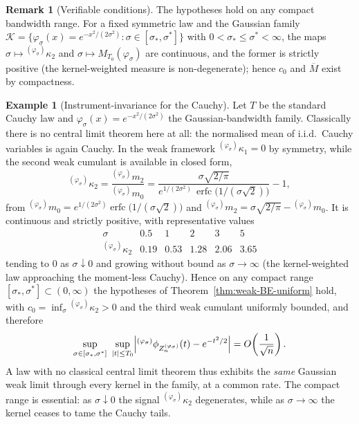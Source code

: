 \documentclass[12pt]{article}
\theoremstyle{definition}
\newtheorem{remark}[theorem]{Remark}
\newtheorem{example}[theorem]{Example}
\begin{document}
\begin{remark}[Verifiable conditions]
\label{rem:uniform-verifiable}
The hypotheses hold on any compact bandwidth range.  For a fixed symmetric
law and the Gaussian family
$\mathcal{K}=\{\varphi_\sigma(x)=e^{-x^2/(2\sigma^2)}:
\sigma\in[\sigma_*,\sigma^*]\}$ with $0<\sigma_*\le\sigma^*<\infty$, the maps
$\sigma\mapsto{}^{(\varphi_\sigma)}\kappa_2$ and
$\sigma\mapsto M_{T_0}(\varphi_\sigma)$ are continuous, and the former is
strictly positive (the kernel-weighted measure is non-degenerate); hence
$c_0$ and $\overline{M}$ exist by compactness.
\end{remark}

\begin{example}[Instrument-invariance for the Cauchy]\label{ex:cauchy-invariance}
Let $T$ be the standard Cauchy law and $\varphi_\sigma(x)=e^{-x^2/(2\sigma^2)}$
the Gaussian-bandwidth family.  Classically there is no central limit theorem
here at all: the normalised mean of i.i.d.\ Cauchy variables is again Cauchy.
In the weak framework ${}^{(\varphi_\sigma)}\kappa_1=0$ by symmetry, while the
second weak cumulant is available in closed form,
\[
{}^{(\varphi_\sigma)}\kappa_2
=\frac{{}^{(\varphi_\sigma)}m_2}{{}^{(\varphi_\sigma)}m_0}
=\frac{\sigma\sqrt{2/\pi}}
       {e^{1/(2\sigma^2)}\,\operatorname{erfc}\!\bigl(1/(\sigma\sqrt2)\bigr)}-1,
\]
from ${}^{(\varphi_\sigma)}m_0=e^{1/(2\sigma^2)}\operatorname{erfc}\bigl(1/(\sigma\sqrt2)\bigr)$
and ${}^{(\varphi_\sigma)}m_2=\sigma\sqrt{2/\pi}-{}^{(\varphi_\sigma)}m_0$.  It
is continuous and strictly positive, with representative values
\[
\begin{array}{c|ccccc}
\sigma & 0.5 & 1 & 2 & 3 & 5\\[2pt]\hline
{}^{(\varphi_\sigma)}\kappa_2 & 0.19 & 0.53 & 1.28 & 2.06 & 3.65
\end{array}
\]
tending to $0$ as $\sigma\downarrow0$ and growing without bound as
$\sigma\to\infty$ (the kernel-weighted law approaching the moment-less
Cauchy).  Hence on any compact range $[\sigma_*,\sigma^*]\subset(0,\infty)$ the
hypotheses of Theorem~\ref{thm:weak-BE-uniform} hold, with
$c_0=\inf_\sigma{}^{(\varphi_\sigma)}\kappa_2>0$ and the third weak cumulant
uniformly bounded, and therefore
\[
\sup_{\sigma\in[\sigma_*,\sigma^*]}\ \sup_{|t|\le T_0}
\Bigl|{}^{(\varphi_\sigma)}\phi_{Z_n^{(\varphi_\sigma)}}(t)-e^{-t^2/2}\Bigr|
=O\!\left(\frac{1}{\sqrt n}\right).
\]
A law with no classical central limit theorem thus exhibits the \emph{same}
Gaussian weak limit through every kernel in the family, at a common rate.  The
compact range is essential: as $\sigma\downarrow0$ the signal
${}^{(\varphi_\sigma)}\kappa_2$ degenerates, while as $\sigma\to\infty$ the
kernel ceases to tame the Cauchy tails.
\end{example}
\end{document}
